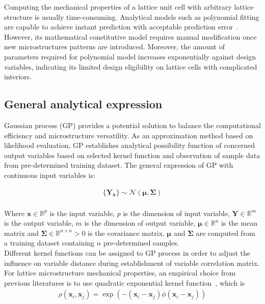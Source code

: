 \documentclass[12pt]{extbook}
\begin{document}
Computing the mechanical properties of a lattice unit cell with arbitrary lattice structure is usually time-consuming. Analytical models such as polynomial fitting are capable to achieve instant prediction with acceptable prediction error~\cite{zhang2021novel}. However, its mathematical constitutive model requires manual modification once new microstructures patterns are introduced. Moreover, the amount of parameters required for polynomial model increases exponentially against design variables, indicating its limited design eligibility on lattice cells with complicated interiors.\\

\subsection{General analytical expression}

Gaussian process (GP) provides a potential solution to balance the computational efficiency and microstructure versatility. As an approximation method based on likelihood evaluation, GP establishes analytical possibility function of concerned output variables based on selected kernel function and observation of sample data from pre-determined training dataset. The general expression of GP with continuous input variables is:

\begin{equation}
\begin{split}
\{\bm{Y}_{\bm{x}}\}\sim \mathcal{N}(\bm{\mu}, \bm{\Sigma})\\
\end{split}
\label{2-1-1}
\end{equation}

Where $\bm{x}\in \mathbb{R}^p$ is the input variable, $p$ is the dimension of input variable, $\bm{Y}\in \mathbb{R}^m$ is the output variable, $m$ is the dimension of output variable, $\bm{\mu}\in \mathbb{R}^n$ is the mean matrix and $\bm{\Sigma}\in \mathbb{R}^{n\times n} > 0$ is the covariance matrix. $\bm{\mu}$ and $\bm{\Sigma}$ are computed from a training dataset containing $n$ pre-determined samples.\\

Different kernel functions can be assigned to GP process in order to adjust the influence on variable distance during establishment of variable correlation matrix. For lattice microstructure mechanical properties, an empirical choice from previous literatures is to use quadratic exponential kernel function~\cite{abrahamsen1997review}, which is
\begin{equation}
\begin{split}
\rho(\bm{x}_i, \bm{x}_j) = \exp(-(\bm{x}_i-\bm{x}_j)\phi(\bm{x}_i-\bm{x}_j))
\end{split}
\label{2-1-6}
\end{equation}
\end{document}

